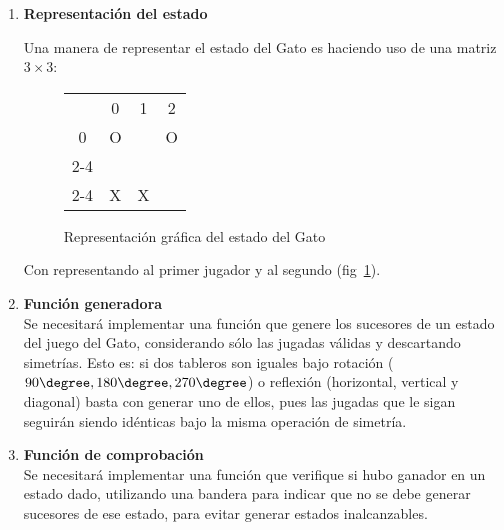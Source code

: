 \begin{enumerate}
  \item \textbf{Representación del estado} \hfill\par
    Una manera de representar el estado del Gato es haciendo uso de una matriz $3 \times 3$:\medskip
    

    \begin{figure}[h!]
      \begin{center}
        \begin{tabular}{c l | l | l }
           & \multicolumn{1}{c}{\tiny{0}} & \multicolumn{1}{c}{\tiny{1}} & \multicolumn{1}{c}{\tiny{2}} \\
           \multicolumn{1}{c}{\tiny{0}} & O &   & O \\ \cline{2-4}
           \multicolumn{1}{c}{\tiny{1}} &   &   &   \\ \cline{2-4}
           \multicolumn{1}{c}{\tiny{2}} & X & X &
        \end{tabular}
      \end{center}
      \caption{Representación gráfica del estado del Gato}
      \label{fig:representacionestado}
    \end{figure}

    Con  representando al primer jugador y  al segundo (fig~\ref{fig:representacionestado}).


  \item \textbf{Función generadora}\hfill \\
    Se necesitará implementar una función que genere los sucesores de un estado del juego del Gato, considerando sólo las jugadas válidas y descartando simetrías.  Esto es: si dos tableros son iguales bajo rotación ($90\degree, 180\degree, 270\degree$) o reflexión (horizontal, vertical y diagonal) basta con generar uno de ellos, pues las jugadas que le sigan seguirán siendo idénticas bajo la misma operación de simetría. 

  \item \textbf{Función de comprobación} \hfill \\
    Se necesitará implementar una función que verifique si hubo ganador en un estado dado, utilizando una bandera para indicar que no se debe generar sucesores de ese estado, para evitar generar estados inalcanzables.
\end{enumerate}


